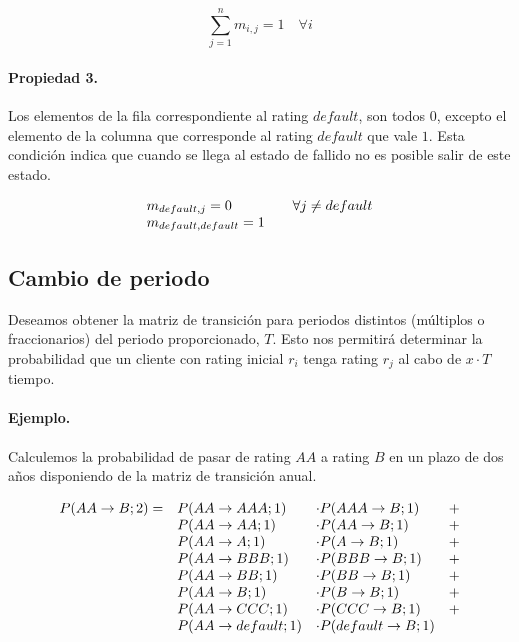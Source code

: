 \begin{displaymath}
\sum_{j=1}^{n} m_{i,j} = 1 \quad \forall i
\end{displaymath}

\paragraph{Propiedad 3.}
Los elementos de la fila correspondiente al rating $default$, son todos $0$,
excepto el elemento de la columna que corresponde al rating $default$ que vale 
$1$. Esta condici\'on indica que cuando se llega al estado de fallido no es 
posible salir de este estado.

\begin{displaymath}
\begin{array}{ll}
m_{default,j} = 0        & \quad \forall j \neq default \cr
m_{default,default} = 1
\end{array}
\end{displaymath}


\subsection{Cambio de periodo}

Deseamos obtener la matriz de transici\'on para periodos distintos (m\'ultiplos o 
fraccionarios) del periodo proporcionado, $T$. Esto nos permitir\'a determinar la 
probabilidad que un cliente con rating inicial $r_i$ tenga rating $r_j$ al cabo 
de $x \cdot T$ tiempo.

\paragraph{Ejemplo.} Calculemos la probabilidad de pasar de rating $AA$ a
rating $B$ en un plazo de dos años disponiendo de la matriz de transici\'on anual.

\begin{displaymath}
\begin{array}{llll}
P(AA \to B;2) = & P(AA \to AAA;1)    & \cdot P(AAA \to B;1)      & + \cr
                & P(AA \to AA;1)      & \cdot P(AA \to B;1)      & + \cr
                & P(AA \to A;1)       & \cdot P(A \to B;1)       & + \cr
                & P(AA \to BBB;1)     & \cdot P(BBB \to B;1)     & + \cr
                & P(AA \to BB;1)      & \cdot P(BB \to B;1)      & + \cr
                & P(AA \to B;1)       & \cdot P(B \to B;1)       & + \cr
                & P(AA \to CCC;1)     & \cdot P(CCC \to B;1)     & + \cr
                & P(AA \to default;1) & \cdot P(default \to B;1) &
\end{array}
\end{displaymath}

